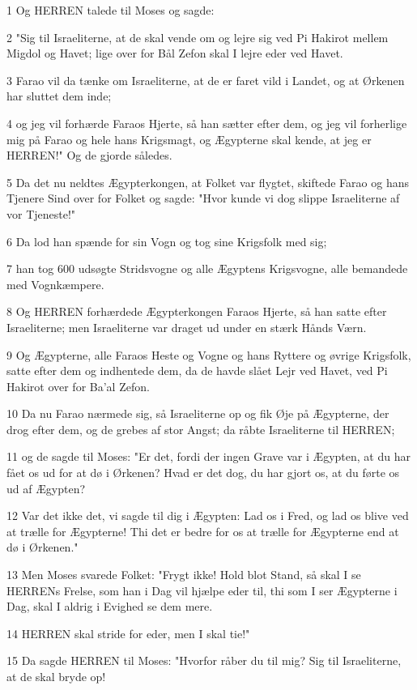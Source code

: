 \par 1 Og HERREN talede til Moses og sagde:
\par 2 "Sig til Israeliterne, at de skal vende om og lejre sig ved Pi Hakirot mellem Migdol og Havet; lige over for Bål Zefon skal I lejre eder ved Havet.
\par 3 Farao vil da tænke om Israeliterne, at de er faret vild i Landet, og at Ørkenen har sluttet dem inde;
\par 4 og jeg vil forhærde Faraos Hjerte, så han sætter efter dem, og jeg vil forherlige mig på Farao og hele hans Krigsmagt, og Ægypterne skal kende, at jeg er HERREN!" Og de gjorde således.
\par 5 Da det nu neldtes Ægypterkongen, at Folket var flygtet, skiftede Farao og hans Tjenere Sind over for Folket og sagde: "Hvor kunde vi dog slippe Israeliterne af vor Tjeneste!"
\par 6 Da lod han spænde for sin Vogn og tog sine Krigsfolk med sig;
\par 7 han tog 600 udsøgte Stridsvogne og alle Ægyptens Krigsvogne, alle bemandede med Vognkæmpere.
\par 8 Og HERREN forhærdede Ægypterkongen Faraos Hjerte, så han satte efter Israeliterne; men Israeliterne var draget ud under en stærk Hånds Værn.
\par 9 Og Ægypterne, alle Faraos Heste og Vogne og hans Ryttere og øvrige Krigsfolk, satte efter dem og indhentede dem, da de havde slået Lejr ved Havet, ved Pi Hakirot over for Ba'al Zefon.
\par 10 Da nu Farao nærmede sig, så Israeliterne op og fik Øje på Ægypterne, der drog efter dem, og de grebes af stor Angst; da råbte Israeliterne til HERREN;
\par 11 og de sagde til Moses: "Er det, fordi der ingen Grave var i Ægypten, at du har fået os ud for at dø i Ørkenen? Hvad er det dog, du har gjort os, at du førte os ud af Ægypten?
\par 12 Var det ikke det, vi sagde til dig i Ægypten: Lad os i Fred, og lad os blive ved at trælle for Ægypterne! Thi det er bedre for os at trælle for Ægypterne end at dø i Ørkenen."
\par 13 Men Moses svarede Folket: "Frygt ikke! Hold blot Stand, så skal I se HERRENs Frelse, som han i Dag vil hjælpe eder til, thi som I ser Ægypterne i Dag, skal I aldrig i Evighed se dem mere.
\par 14 HERREN skal stride for eder, men I skal tie!"
\par 15 Da sagde HERREN til Moses: "Hvorfor råber du til mig? Sig til Israeliterne, at de skal bryde op!
